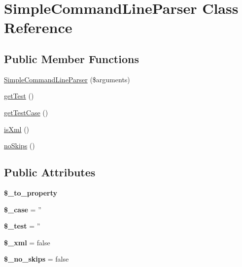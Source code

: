 \hypertarget{class_simple_command_line_parser}{
\section{SimpleCommandLineParser Class Reference}
\label{class_simple_command_line_parser}
}
\subsection*{Public Member Functions}
\begin{DoxyCompactItemize}
\item 
\hyperlink{class_simple_command_line_parser_a473ff2d1b54f42f744ecd5d1ab597b38}{SimpleCommandLineParser} (\$arguments)
\item 
\hyperlink{class_simple_command_line_parser_a1d42d4407267d9665feeeeca03e8b39a}{getTest} ()
\item 
\hyperlink{class_simple_command_line_parser_a5e43739737c07f53d98565725c9b9b67}{getTestCase} ()
\item 
\hyperlink{class_simple_command_line_parser_ad6c4d5e0a31a8fdc6dadf8e48de72916}{isXml} ()
\item 
\hyperlink{class_simple_command_line_parser_a61634a1ea5fd4638199ed0a7e5a55115}{noSkips} ()
\end{DoxyCompactItemize}
\subsection*{Public Attributes}
\begin{DoxyCompactItemize}
\item 
{\bfseries \$\_\-to\_\-property}
\item 
\hypertarget{class_simple_command_line_parser_a7c73d1939a6fa9790636b3833d0f364e}{
{\bfseries \$\_\-case} = ''}
\label{class_simple_command_line_parser_a7c73d1939a6fa9790636b3833d0f364e}

\item 
\hypertarget{class_simple_command_line_parser_aaabb356eb6e188914c7c839334795ed0}{
{\bfseries \$\_\-test} = ''}
\label{class_simple_command_line_parser_aaabb356eb6e188914c7c839334795ed0}

\item 
\hypertarget{class_simple_command_line_parser_ab094a5854ca32ae3f9e6cf31dba3ddfe}{
{\bfseries \$\_\-xml} = false}
\label{class_simple_command_line_parser_ab094a5854ca32ae3f9e6cf31dba3ddfe}

\item 
\hypertarget{class_simple_command_line_parser_a16ef4b1143e5e9ac7859a683bc1fc54e}{
{\bfseries \$\_\-no\_\-skips} = false}
\label{class_simple_command_line_parser_a16ef4b1143e5e9ac7859a683bc1fc54e}

\end{DoxyCompactItemize}


